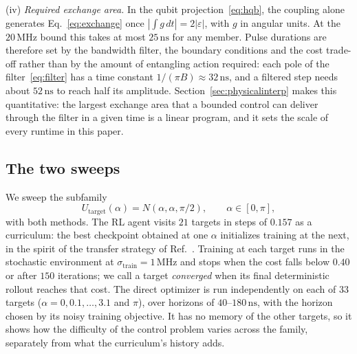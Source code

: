\documentclass[aps,prx,twocolumn,superscriptaddress,nofootinbib,amsmath,amssymb,floatfix]{revtex4-2}
\newcommand{\Ntgt}[2]{N(#1,#1,#2)}
\newcommand{\Utgt}{U_{\mathrm{target}}}
\newcommand{\strain}{\sigma_{\mathrm{train}}}
\newcommand{\ns}{\,\mathrm{ns}}
\newcommand{\MHz}{\,\mathrm{MHz}}
\begin{document}
(iv) \emph{Required exchange area.} In the qubit projection~\eqref{eq:hqb}, the coupling alone
generates Eq.~\eqref{eq:exchange} once $|\int g\,dt|=2|\varepsilon|$, with $g$ in angular units. At the
$20\MHz$ bound this takes at most $25\ns$ for any member. Pulse durations are therefore set by the
bandwidth filter, the boundary conditions and the cost trade-off rather than by the amount of entangling
action required: each pole of the filter~\eqref{eq:filter} has a time constant $1/(\pi B)\approx32\ns$,
and a filtered step needs about $52\ns$ to reach half its amplitude. Section~\ref{sec:physicalinterp}
makes this quantitative: the largest exchange area that a bounded control can deliver through the filter
in a given time is a linear program, and it sets the scale of every runtime in this paper.

\subsection{The two sweeps}

We sweep the subfamily
\begin{equation}
\Utgt(\alpha)=\Ntgt{\alpha}{\pi/2},\qquad \alpha\in[0,\pi],
\label{eq:runtimefamily}
\end{equation}
with both methods. The RL agent visits $21$ targets in steps of $0.157$ as a curriculum: the best
checkpoint obtained at one $\alpha$ initializes training at the next, in the spirit of the transfer
strategy of Ref.~\cite{Niu2019}. Training at each target runs in the stochastic environment at
$\strain=1\MHz$ and stops when the cost falls below $0.40$ or after $150$ iterations; we call a target
\emph{converged} when its final deterministic rollout reaches that cost. The direct optimizer is run
independently on each of $33$ targets ($\alpha=0,0.1,\dots,3.1$ and $\pi$), over horizons of
$40$--$180\ns$, with the horizon chosen by its noisy training objective. It has no memory of the other
targets, so it shows how the difficulty of the control problem varies across the family, separately from
what the curriculum's history adds.
\end{document}
